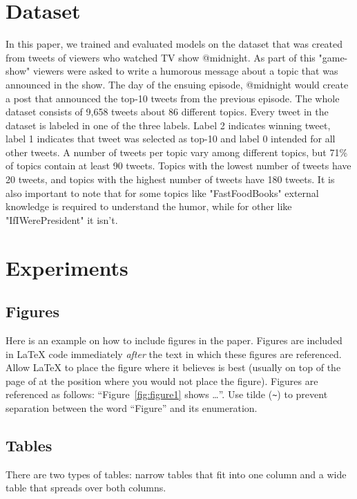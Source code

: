 \documentclass[10pt, a4paper]{article}
\begin{document}
\section{Dataset}
In this paper, we trained and evaluated models on the dataset that was created from tweets of viewers who watched TV show @midnight. As part of this "game-show" viewers were asked to write a humorous message about a topic that was announced in the show. The day of the ensuing episode, @midnight would create a post that announced the top-10 tweets from the previous episode. The whole dataset consists of 9,658 tweets about 86 different topics. Every tweet in the dataset is labeled in one of the three labels. Label 2 indicates winning tweet, label 1 indicates that tweet was selected as top-10 and label 0 intended for all other tweets. A number of tweets per topic vary among different topics, but 71\% of topics contain at least 90 tweets. Topics with the lowest number of tweets have 20 tweets, and topics with the highest number of tweets have 180 tweets. It is also important to note that for some topics like "FastFoodBooks" external knowledge is required to understand the humor, while for other like "IfIWerePresident" it isn't.

\section{Experiments}

\subsection{Figures}

Here is an example on how to include figures in the paper. Figures are included in \LaTeX{} code immediately \textit{after} the text in which these figures are referenced. Allow \LaTeX{} to place the figure where it believes is best (usually on top of the page of at the position where you would not place the figure). Figures are referenced as follows: ``Figure~\ref{fig:figure1} shows \dots''. Use tilde (\verb.~.) to prevent separation between the word ``Figure'' and its enumeration. 

\subsection{Tables}

There are two types of tables: narrow tables that fit into one column and a wide table that spreads over both columns.
\end{document}
